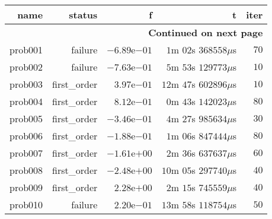 \documentclass[varwidth=20cm,crop=true]{standalone}
\begin{document}
\begin{longtable}{rrrrr}
\hline
name & status & f & t & iter \\\hline
\endhead
\hline
\multicolumn{5}{r}{{\bfseries Continued on next page}}\\
\hline
\endfoot
\endlastfoot
prob001 & failure & \(-6.89\)e\(-01\) & \( 1\)m \(02\)s \(368558 \mu\)s & \(    70\) \\
prob002 & failure & \(-7.63\)e\(-01\) & \( 5\)m \(53\)s \(129773 \mu\)s & \(    10\) \\
prob003 & first\_order & \( 3.97\)e\(-01\) & \(12\)m \(47\)s \(602896 \mu\)s & \(    10\) \\
prob004 & first\_order & \( 8.12\)e\(-01\) & \( 0\)m \(43\)s \(142023 \mu\)s & \(    80\) \\
prob005 & first\_order & \(-3.46\)e\(-01\) & \( 4\)m \(27\)s \(985634 \mu\)s & \(    30\) \\
prob006 & first\_order & \(-1.88\)e\(-01\) & \( 1\)m \(06\)s \(847444 \mu\)s & \(    80\) \\
prob007 & first\_order & \(-1.61\)e\(+00\) & \( 2\)m \(36\)s \(637637 \mu\)s & \(    60\) \\
prob008 & first\_order & \(-2.48\)e\(+00\) & \(10\)m \(05\)s \(297740 \mu\)s & \(    40\) \\
prob009 & first\_order & \( 2.28\)e\(+00\) & \( 2\)m \(15\)s \(745559 \mu\)s & \(    40\) \\
prob010 & failure & \( 2.20\)e\(-01\) & \(13\)m \(58\)s \(118754 \mu\)s & \(    50\) \\\hline
\end{longtable}
\end{document}
